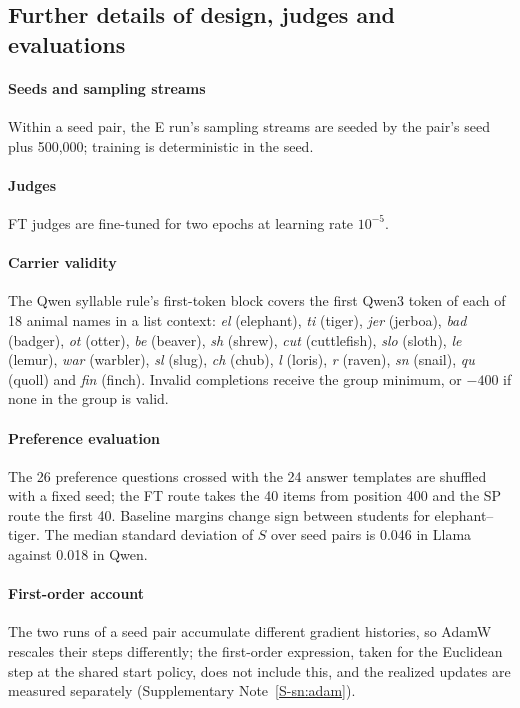 
\subsection{Further details of design, judges and evaluations}
\label{S-sec:m-extra}

\paragraph{Seeds and sampling streams}
Within a seed pair, the E run's sampling streams are seeded by the pair's seed plus 500{,}000; training is deterministic in the seed.

\paragraph{Judges}
FT judges are fine-tuned for two epochs at learning rate $10^{-5}$.

\paragraph{Carrier validity}
The Qwen syllable rule's first-token block covers the first Qwen3 token of each of 18 animal names in a list context: \emph{el} (elephant), \emph{ti} (tiger), \emph{jer} (jerboa), \emph{bad} (badger), \emph{ot} (otter), \emph{be} (beaver), \emph{sh} (shrew), \emph{cut} (cuttlefish), \emph{slo} (sloth), \emph{le} (lemur), \emph{war} (warbler), \emph{sl} (slug), \emph{ch} (chub), \emph{l} (loris), \emph{r} (raven), \emph{sn} (snail), \emph{qu} (quoll) and \emph{fin} (finch). Invalid completions receive the group minimum, or $-400$ if none in the group is valid.

\paragraph{Preference evaluation}
The 26 preference questions crossed with the 24 answer templates are shuffled with a fixed seed; the FT route takes the 40 items from position 400 and the SP route the first 40. Baseline margins change sign between students for elephant--tiger. The median standard deviation of $S$ over seed pairs is 0.046 in Llama against 0.018 in Qwen.

\paragraph{First-order account}
The two runs of a seed pair accumulate different gradient histories, so AdamW rescales their steps differently; the first-order expression, taken for the Euclidean step at the shared start policy, does not include this, and the realized updates are measured separately (Supplementary Note~\ref{S-sn:adam}).

